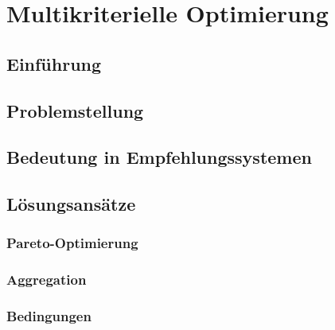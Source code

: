 
\chapter{Multikriterielle Optimierung}
\label{ch:erweiterungen}

\section{Einführung}
\label{ch:erweiterungen:einführung}

\section{Problemstellung}

\section{Bedeutung in Empfehlungssystemen}

\section{Lösungsansätze}

\subsection{Pareto-Optimierung}

\subsection{Aggregation}

\subsection{Bedingungen}

